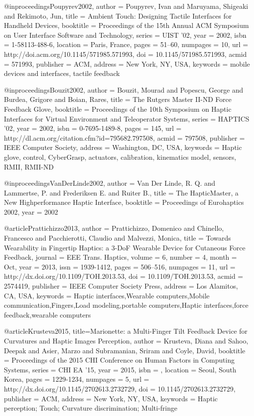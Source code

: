 @inproceedings{Poupyrev2002,
	author = {Poupyrev, Ivan and Maruyama, Shigeaki and Rekimoto, Jun},
	title = {{Ambient Touch: Designing Tactile Interfaces for Handheld Devices}},
	booktitle = {Proceedings of the 15th Annual ACM Symposium on User Interface Software and Technology},
	series = {UIST '02},
	year = {2002},
	isbn = {1-58113-488-6},
	location = {Paris, France},
	pages = {51--60},
	numpages = {10},
	url = {http://doi.acm.org/10.1145/571985.571993},
	doi = {10.1145/571985.571993},
	acmid = {571993},
	publisher = {ACM},
	address = {New York, NY, USA},
	keywords = {mobile devices and interfaces, tactile feedback}
} 

@inproceedings{Bouzit2002,
	author = {Bouzit, Mourad and Popescu, George and Burdea, Grigore and Boian, Rares},
	title = {{The Rutgers Master II-ND Force Feedback Glove}},
	booktitle = {Proceedings of the 10th Symposium on Haptic Interfaces for Virtual Environment and Teleoperator Systems},
	series = {HAPTICS '02},
	year = {2002},
	isbn = {0-7695-1489-8},
	pages = {145},
	url = {http://dl.acm.org/citation.cfm?id=795682.797508},
	acmid = {797508},
	publisher = {IEEE Computer Society},
	address = {Washington, DC, USA},
	keywords = {Haptic glove, control, CyberGrasp, actuators, calibration, kinematics model, sensors, RMII, RMII-ND}
} 

@inproceedings{VanDerLinde2002,
	author = {Van Der Linde, R. Q. and Lammertse, P. and Frederiksen E. and Ruiter B.},
	title = {The {HapticMaster}, a New Highperformance Haptic Interface},
	booktitle = {Proceedings of Eurohaptics 2002},
	year = {2002}
} 



@article{Prattichizzo2013,
 author = {Prattichizzo, Domenico and Chinello, Francesco and Pacchierotti, Claudio and Malvezzi, Monica},
 title = {{Towards Wearability in Fingertip Haptics: a 3-DoF Wearable Device for Cutaneous Force Feedback}},
 journal = {EEE Trans. Haptics},
 volume = {6},
 number = {4},
 month = {Oct},
 year = {2013},
 issn = {1939-1412},
 pages = {506--516},
 numpages = {11},
 url = {http://dx.doi.org/10.1109/TOH.2013.53},
 doi = {10.1109/TOH.2013.53},
 acmid = {2574419},
 publisher = {IEEE Computer Society Press},
 address = {Los Alamitos, CA, USA}, 
 keywords = {Haptic interfaces,Wearable computers,Mobile communication,Fingers,Load modeling,portable computers,Haptic interfaces,force feedback,wearable computers}
}

@article{Krusteva2015,
 title={{Marionette: a Multi-Finger Tilt Feedback Device for Curvatures and Haptic Images Perception}},
 author = {Krusteva, Diana and Sahoo, Deepak and Asier, Marzo and Subramanian, Sriram and Coyle, David},
 booktitle = {Proceedings of the 2015 CHI Conference on Human Factors in Computing Systems},
 series = {CHI EA '15},
 year = {2015},
 isbn = {},
 location = {Seoul, South Korea},
 pages = {1229-1234},
 numpages = {5},
 url = {http://dx.doi.org/10.1145/2702613.2732729},
 doi = {10.1145/2702613.2732729},
 publisher = {ACM},
 address = {New York, NY, USA},
 keywords = {Haptic perception; Touch; Curvature discrimination; Multi-fringe}
}


